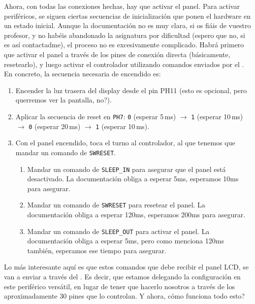 \documentclass[../main.tex]{subfiles}
\begin{document}
        Ahora, con todas las conexiones hechas, hay que activar el panel. Para activar periféricos, se siguen ciertas secuencias de inicialización que ponen el hardware en un estado inicial. Aunque la documentación no es muy clara, si os fiáis de vuestro profesor, y no habéis abandonado la asignatura por dificultad (espero que no, si es así contactadme), el proceso no es excesivamente complicado. Habrá primero que activar el panel a través de los pines de conexión directa (básicamente, resetearlo), y luego activar el controlador \LCDMAN utilizando comandos enviados por el . En concreto, la secuencia necesaria de encendido es:

        \begin{enumerate}
            \item Encender la luz trasera del display desde el pin PH11 (esto es opcional, pero querremos ver la pantalla, no?).
            \item Aplicar la secuencia de reset en \texttt{PH7}: \texttt{0} (esperar 5\,ms) $\to$ \texttt{1} (esperar 10\,ms) $\to$ \texttt{0} (esperar 20\,ms) $\to$ \texttt{1} (esperar 10\,ms).
            \item Con el panel encendido, toca el turno al controlador, al que tenemos que mandar un comando de \texttt{SWRESET}. 
                \begin{enumerate}
                    \item Mandar un comando de \texttt{SLEEP\_IN} \LCDMAN[9.1.11] para asegurar que el panel está desactivado. La documentación obliga a esperar 5ms, esperamos 10ms para asegurar.
                    \item Mandar un comando de \texttt{SWRESET} \LCDMAN[9.1.2] para resetear el panel. La documentación obliga a esperar 120ms, esperamos 200ms para asegurar.
                    \item Mandar un comando de \texttt{SLEEP\_OUT} \LCDMAN[9.1.12] para activar el panel. La documentación obliga a esperar 5ms, pero como menciona 120ms también, esperamos ese tiempo para asegurar. 
                \end{enumerate}
        \end{enumerate}

        Lo más interesante aquí es que estos comandos que debe recibir el panel LCD, se van a enviar a través del . Es decir, que estamos delegando la configuración en este periférico versátil, en lugar de tener que hacerlo nosotros a través de los aproximadamente 30 pines que lo controlan. Y ahora, cómo funciona todo esto?
\end{document}
